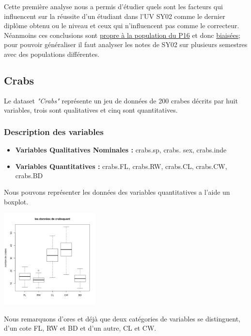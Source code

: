 \documentclass[10pt]{article}
\begin{document}
	Cette première analyse nous a permis d'étudier quels sont les facteurs qui influencent sur la réussite d'un étudiant dans l'UV SY02 comme le dernier diplôme obtenu ou le niveau et ceux qui n'influencent pas comme le correcteur. Néanmoins ces conclusions sont \underline{propre à la population du P16} et donc  \underline{biaisées}; pour pouvoir généraliser il faut analyser les notes de SY02 sur plusieurs semestres avec des populations différentes.
	
	\subsection{Crabs}
	Le dataset \textit{"Crabs"} représente un jeu de données de 200 crabes décrits par huit variables, trois sont qualitatives et cinq sont quantitatives.
	
	\subsubsection{Description des variables}
	
	\begin{itemize}
		\item \textbf{Variables Qualitatives Nominales :}  crabs.sp, crabs. sex, crabs.inde
		\item \textbf{Variables Quantitatives : } crabs.FL, crabs.RW, crabs.CL, crabs.CW, crabs.BD
	\end{itemize}
	
	Nous pouvons représenter les données des variables quantitatives a l'aide un boxplot.
	\begin{center}
		\includegraphics[width=50mm]{Figures/Crabs/bxp_crabsquant.png}
		\label{fig:boxplot_crabs_quantitatives}
	\end{center}
	
	Nous remarquons d'ores et déjà que deux catégories de variables se distinguent, d'un cote FL, RW et BD et d'un autre, CL et CW.
	
\end{document}
